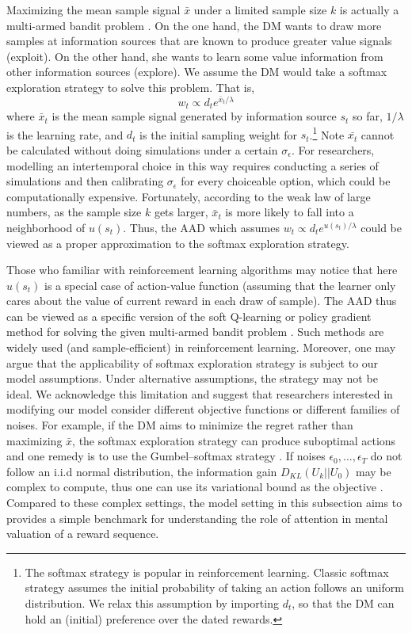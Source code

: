 \documentclass[
  12pt,
]{article}
\begin{document}
Maximizing the mean sample signal \(\bar{x}\) under a limited sample
size \(k\) is actually a multi-armed bandit problem
\citep[][Ch.2]{sutton2018reinforcement}. On the one hand, the DM wants
to draw more samples at information sources that are known to produce
greater value signals (exploit). On the other hand, she wants to learn
some value information from other information sources (explore). We
assume the DM would take a softmax exploration strategy to solve this
problem. That is,\[
w_t \propto d_t e^{\bar{x}_t/\lambda}
\]where \(\bar{x}_t\) is the mean sample signal generated by information
source \(s_t\) so far, \(1/\lambda\) is the learning rate, and \(d_t\)
is the initial sampling weight for \(s_t\).\footnote{The softmax
  strategy is popular in reinforcement learning. Classic softmax
  strategy assumes the initial probability of taking an action follows
  an uniform distribution. We relax this assumption by importing
  \(d_t\), so that the DM can hold an (initial) preference over the
  dated rewards.} Note \(\bar{x_t}\) cannot be calculated without doing
simulations under a certain \(\sigma_\epsilon\). For researchers,
modelling an intertemporal choice in this way requires conducting a
series of simulations and then calibrating \(\sigma_\epsilon\) for every
choiceable option, which could be computationally expensive.
Fortunately, according to the weak law of large numbers, as the sample
size \(k\) gets larger, \(\bar{x}_t\) is more likely to fall into a
neighborhood of \(u(s_t)\). Thus, the AAD which assumes
\(w_t \propto d_t e^{u(s_t)/\lambda}\) could be viewed as a proper
approximation to the softmax exploration strategy.

Those who familiar with reinforcement learning algorithms may notice
that here \(u(s_t)\) is a special case of action-value function
(assuming that the learner only cares about the value of current reward
in each draw of sample). The AAD thus can be viewed as a specific
version of the soft Q-learning or policy gradient method for solving the
given multi-armed bandit problem
\citep{haarnoja2017reinforcement, schulman2017equivalence}. Such methods
are widely used (and sample-efficient) in reinforcement learning.
Moreover, one may argue that the applicability of softmax exploration
strategy is subject to our model assumptions. Under alternative
assumptions, the strategy may not be ideal. We acknowledge this
limitation and suggest that researchers interested in modifying our
model consider different objective functions or different families of
noises. For example, if the DM aims to minimize the regret rather than
maximizing \(\bar{x}\), the softmax exploration strategy can produce
suboptimal actions and one remedy is to use the Gumbel--softmax strategy
\citep{cesa2017boltzmann}. If noises \(\epsilon_0,...,\epsilon_T\) do
not follow an i.i.d normal distribution, the information gain
\(D_{KL}(U_k||U_0)\) may be complex to compute, thus one can use its
variational bound as the objective \citep{houthooft2016vime}. Compared
to these complex settings, the model setting in this subsection aims to
provides a simple benchmark for understanding the role of attention in
mental valuation of a reward sequence.
\end{document}

